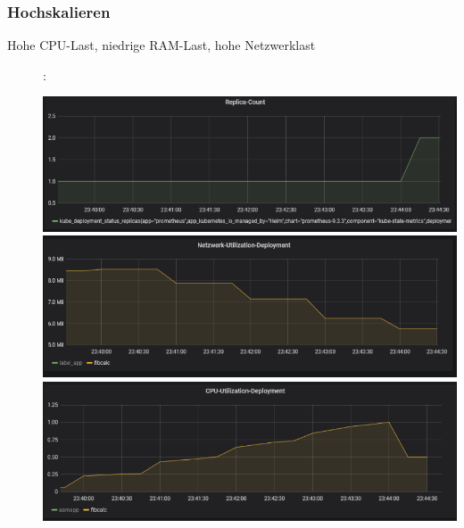 \documentclass[a4paper,10pt]{scrartcl}
\begin{document}
\pagebreak

\subsubsection{Hochskalieren}

\begin{description}

\item[Hohe CPU-Last, niedrige RAM-Last, hohe Netzwerklast]:\\

\begin{minipage}{\linewidth}
            \includegraphics[width=1\textwidth]{img/CPUSkalierung/ReplicaCount.PNG}\\
            
            \includegraphics[width=1\textwidth,height=.14\textheight]{img/CPUSkalierung/Netzwerk.PNG}\\
            
  			\includegraphics[width=1\textwidth]{img/CPUSkalierung/CPUSaturation.PNG}
\end{minipage}


\end{description}
\end{document}
